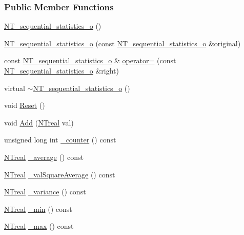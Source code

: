 \subsubsection*{Public Member Functions}
\begin{DoxyCompactItemize}
\item 
\hyperlink{class_n_t__sequential__statistics__o_aba7b0326aceba65082415ab67fcdb074}{NT\_\-sequential\_\-statistics\_\-o} ()
\item 
\hyperlink{class_n_t__sequential__statistics__o_a0b48ff11ae9196591724cc0e18e55de1}{NT\_\-sequential\_\-statistics\_\-o} (const \hyperlink{class_n_t__sequential__statistics__o}{NT\_\-sequential\_\-statistics\_\-o} \&original)
\item 
const \hyperlink{class_n_t__sequential__statistics__o}{NT\_\-sequential\_\-statistics\_\-o} \& \hyperlink{class_n_t__sequential__statistics__o_a2ea838d1c19b874ce8d915c7d3a1a931}{operator=} (const \hyperlink{class_n_t__sequential__statistics__o}{NT\_\-sequential\_\-statistics\_\-o} \&right)
\item 
virtual \hyperlink{class_n_t__sequential__statistics__o_a592c53aa34524d2feb59b3242859d681}{$\sim$NT\_\-sequential\_\-statistics\_\-o} ()
\item 
void \hyperlink{class_n_t__sequential__statistics__o_a733c6af5d95ca1002cee6f2af6bae9a9}{Reset} ()
\item 
void \hyperlink{class_n_t__sequential__statistics__o_aa1ad91a3ff749be05ddc8f2a6b2e9583}{Add} (\hyperlink{nt__types_8h_a814a97893e9deb1eedcc7604529ba80d}{NTreal} val)
\item 
unsigned long int \hyperlink{class_n_t__sequential__statistics__o_a0654233bd14aea72a974ac8bfb047a5d}{\_\-counter} () const 
\item 
\hyperlink{nt__types_8h_a814a97893e9deb1eedcc7604529ba80d}{NTreal} \hyperlink{class_n_t__sequential__statistics__o_a52b9367ac6e7f4f2bcb2c07851e74e53}{\_\-average} () const 
\item 
\hyperlink{nt__types_8h_a814a97893e9deb1eedcc7604529ba80d}{NTreal} \hyperlink{class_n_t__sequential__statistics__o_a63f70f2d01d1de5c150e296f857380d0}{\_\-valSquareAverage} () const 
\item 
\hyperlink{nt__types_8h_a814a97893e9deb1eedcc7604529ba80d}{NTreal} \hyperlink{class_n_t__sequential__statistics__o_aa0729f6b96a8d2588e9b92526a1a38fd}{\_\-variance} () const 
\item 
\hyperlink{nt__types_8h_a814a97893e9deb1eedcc7604529ba80d}{NTreal} \hyperlink{class_n_t__sequential__statistics__o_a537d69155b551a00a81f2995a29183c2}{\_\-min} () const 
\item 
\hyperlink{nt__types_8h_a814a97893e9deb1eedcc7604529ba80d}{NTreal} \hyperlink{class_n_t__sequential__statistics__o_a222b2c884cdc329e9238d10f886693a3}{\_\-max} () const 
\end{DoxyCompactItemize}
